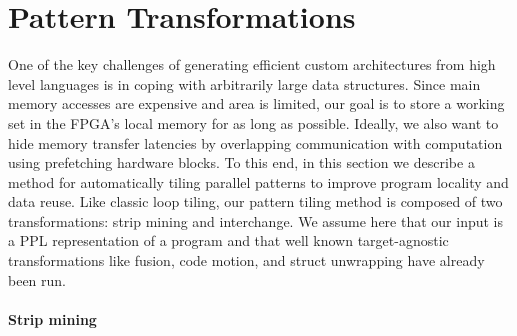 \section{Pattern Transformations}
\label{transformations}

One of the key challenges of generating efficient custom architectures from high level languages is in coping with arbitrarily large data structures. Since main memory accesses
are expensive and area is limited, our goal is to store a working set in the FPGA's local memory for as long as possible. Ideally, we also want
to hide memory transfer latencies by overlapping communication with computation using prefetching hardware blocks.
To this end, in this section we describe a method for automatically tiling parallel patterns to improve program locality and data reuse.
Like classic loop tiling, our pattern tiling method is composed of two transformations: strip mining and interchange.
We assume here that our input is a PPL representation of a program and that well known target-agnostic transformations like fusion, code motion, and struct unwrapping have already been run.



\paragraph{Strip mining} %

